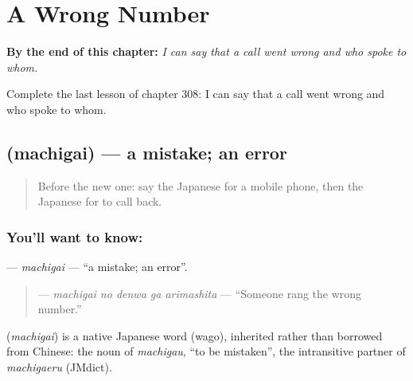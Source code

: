 
\chapter{A Wrong Number}
\label{ch:ja-a-wrong-number}

\begin{chapteropening}
\textbf{By the end of this chapter:} \emph{I can say that a call went wrong and who spoke to whom.}

Complete the last lesson of chapter 308: I can say that a call went wrong and who spoke to whom.
\end{chapteropening}

\section[\texorpdfstring{\ja{まちがい} (machigai)}{まちがい (machigai)}]{ (machigai) — a mistake; an error}

\label{lesson:JA-C308-machigai}



\begin{quote}
Before the new one: say the Japanese for a mobile phone, then the Japanese for to call back.
\end{quote}

\subsection*{You'll want to know: }
\textbf{} — \emph{machigai} — \textquotedblleft{}a mistake; an error\textquotedblright{}.

\begin{quote}
\textbf{  } — \emph{machigai no denwa ga arimashita} — \textquotedblleft{}Someone rang the wrong number.\textquotedblright{}
\end{quote}

\begin{cousinweb}
\textbf{} (\emph{machigai}) is a native Japanese word (wago), inherited rather than borrowed from Chinese: the noun of \emph{machigau}, \textquotedblleft{}to be mistaken\textquotedblright{}, the intransitive partner of \emph{machigaeru} (JMdict).
\end{cousinweb}

